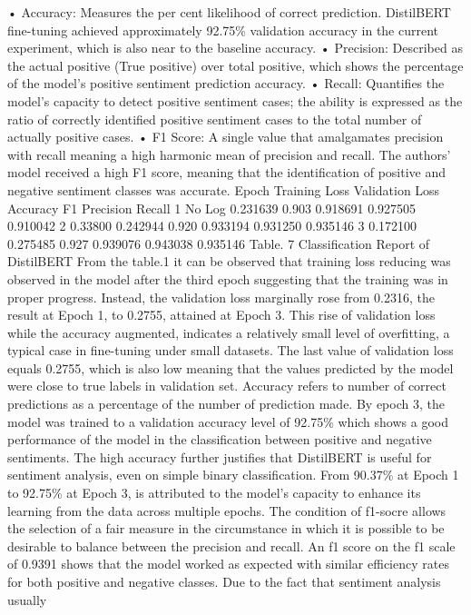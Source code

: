 \documentclass[
  11pt,
]{article}
\begin{document}
• Accuracy: Measures the per cent likelihood of correct prediction.
DistilBERT fine-tuning achieved approximately 92.75\% validation
accuracy in the current experiment, which is also near to the baseline
accuracy. • Precision: Described as the actual positive (True positive)
over total positive, which shows the percentage of the model's positive
sentiment prediction accuracy. • Recall: Quantifies the model's capacity
to detect positive sentiment cases; the ability is expressed as the
ratio of correctly identified positive sentiment cases to the total
number of actually positive cases. • F1 Score: A single value that
amalgamates precision with recall meaning a high harmonic mean of
precision and recall. The authors' model received a high F1 score,
meaning that the identification of positive and negative sentiment
classes was accurate. Epoch Training Loss Validation Loss Accuracy F1
Precision Recall 1 No Log 0.231639 0.903 0.918691 0.927505 0.910042 2
0.33800 0.242944 0.920 0.933194 0.931250 0.935146 3 0.172100 0.275485
0.927 0.939076 0.943038 0.935146 Table. 7 Classification Report of
DistilBERT From the table.1 it can be observed that training loss
reducing was observed in the model after the third epoch suggesting that
the training was in proper progress. Instead, the validation loss
marginally rose from 0.2316, the result at Epoch 1, to 0.2755, attained
at Epoch 3. This rise of validation loss while the accuracy augmented,
indicates a relatively small level of overfitting, a typical case in
fine-tuning under small datasets. The last value of validation loss
equals 0.2755, which is also low meaning that the values predicted by
the model were close to true labels in validation set. Accuracy refers
to number of correct predictions as a percentage of the number of
prediction made. By epoch 3, the model was trained to a validation
accuracy level of 92.75\% which shows a good performance of the model in
the classification between positive and negative sentiments. The high
accuracy further justifies that DistilBERT is useful for sentiment
analysis, even on simple binary classification. From 90.37\% at Epoch 1
to 92.75\% at Epoch 3, is attributed to the model's capacity to enhance
its learning from the data across multiple epochs. The condition of
f1-socre allows the selection of a fair measure in the circumstance in
which it is possible to be desirable to balance between the precision
and recall. An f1 score on the f1 scale of 0.9391 shows that the model
worked as expected with similar efficiency rates for both positive and
negative classes. Due to the fact that sentiment analysis usually
\end{document}
